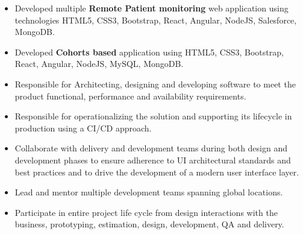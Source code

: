 \documentclass[11pt,a4paper,ragged2e]{altacv}
\begin{document}


\tagline{}

\begin{fullwidth}
\makecvheader
\end{fullwidth}




\begin{itemize}
\item Developed multiple \textbf{Remote Patient monitoring} web application using technologies
HTML5, CSS3, Bootstrap, React, Angular, NodeJS, Salesforce, MongoDB. 
\item Developed \textbf{Cohorts based}  application  using HTML5, CSS3,
Bootstrap, React, Angular, NodeJS, MySQL, MongoDB. 
\item  Responsible for Architecting, designing and developing software to meet the
product functional, performance and availability requirements. 
\item Responsible for operationalizing the solution and supporting its lifecycle in
production using a CI/CD approach.
\item Collaborate with delivery and development teams during both design and
development phases to ensure adherence to UI architectural standards and best
practices and to drive the development of a modern user interface layer.
\item Lead and mentor multiple development teams spanning global locations.
\item Participate in entire project life cycle from design interactions with the business,
prototyping, estimation, design, development, QA and delivery.

\end{itemize}
\smallskip
\divider
\end{document}
